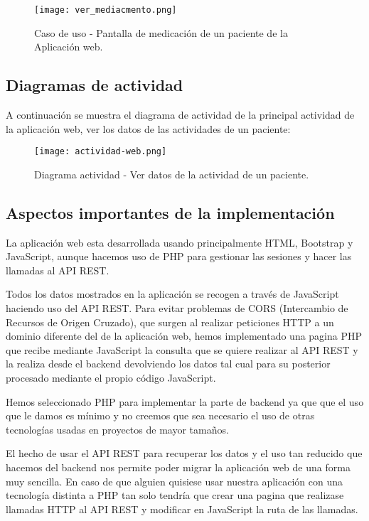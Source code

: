 \documentclass[11pt,spanish]{article}
\begin{document}
\begin{figure}[H]
  \centering
  \texttt{[image: ver\_mediacmento.png]}
  \caption{Caso de uso - Pantalla de medicación de un paciente de la Aplicación web.}
\end{figure}


\subsection{Diagramas de actividad}
A continuación se muestra el diagrama de actividad de la principal actividad de la aplicación web, ver los datos de las actividades de un paciente:

\begin{figure}[H]
  \centering
  \texttt{[image: actividad-web.png]}
  \caption{Diagrama actividad - Ver datos de la actividad de un paciente.}
\end{figure}

\subsection{Aspectos importantes de la implementación}

La aplicación web esta desarrollada usando principalmente HTML, Bootstrap y JavaScript, aunque hacemos uso de PHP para gestionar las sesiones y hacer las llamadas al API REST.
\newline

Todos los datos mostrados en la aplicación se recogen a través de JavaScript haciendo uso del API REST. Para evitar problemas de CORS (Intercambio de Recursos de Origen Cruzado), que surgen al realizar peticiones HTTP a un dominio diferente del de la aplicación web, hemos implementado una pagina PHP que recibe mediante JavaScript la consulta que se quiere realizar al API REST y la realiza desde el backend devolviendo los datos tal cual para su posterior procesado mediante el propio código JavaScript.
\newline

Hemos seleccionado PHP para implementar la parte de backend ya que que el uso que le damos es mínimo y no creemos que sea necesario el uso de otras tecnologías usadas en proyectos de mayor tamaños.
\newline

El hecho de usar el API REST para recuperar los datos y el uso tan reducido que hacemos del backend nos permite poder migrar la aplicación web de una forma muy sencilla. En caso de que alguien quisiese usar nuestra aplicación con una tecnología distinta a PHP tan solo tendría que crear una pagina que realizase llamadas HTTP al API REST y modificar en JavaScript la ruta de las llamadas.
\newpage
\end{document}
